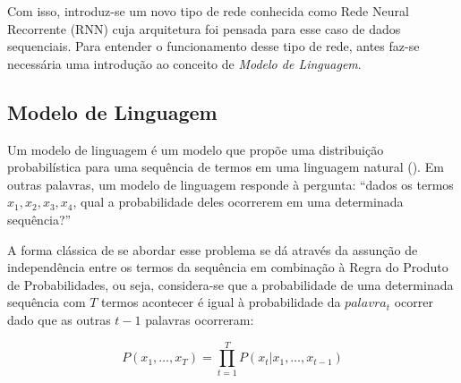 
Com isso, introduz-se um novo tipo de rede conhecida como Rede Neural Recorrente (RNN) cuja arquitetura foi pensada para esse caso de dados sequenciais. Para entender o funcionamento desse tipo de rede, antes faz-se necessária uma introdução ao conceito de \textit{Modelo de Linguagem}.

\subsection{Modelo de Linguagem}

Um modelo de linguagem é um modelo que propõe uma distribuição probabilística para uma sequência de termos em uma linguagem natural (\cite{manning99foundations}).
Em outras palavras, um modelo de linguagem responde à pergunta: “dados os termos $x_1,x_2,x_3,x_4$, qual a probabilidade deles ocorrerem em uma determinada sequência?”

A forma clássica de se abordar esse problema se dá através da assunção de independência entre os termos da sequência em combinação à Regra do Produto de Probabilidades, ou seja, considera-se que a probabilidade de uma determinada sequência com $T$ termos acontecer é igual à probabilidade da $palavra_{t}$ ocorrer dado que as outras $t-1$ palavras ocorreram:

\begin{equation}
P(x_1, \dots, x_T) = \prod_{t=1}^{T} P(x_t \vert x_1, \dots, x_{t-1}) 
\end{equation}

